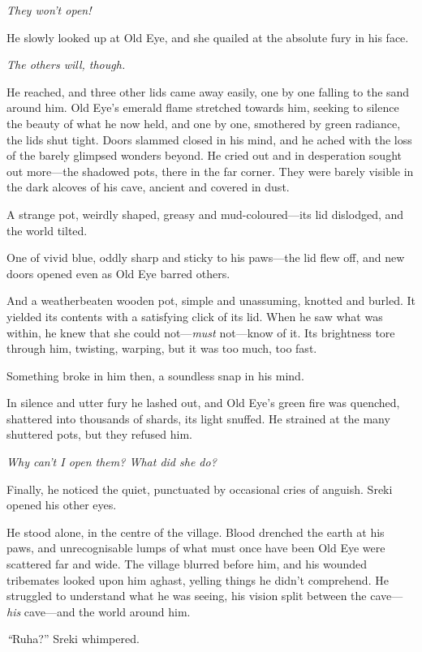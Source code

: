 \emph{They won't open!}

He slowly looked up at Old Eye, and she quailed at the absolute fury in his face.

\emph{The others will, though.}

He reached, and three other lids came away easily, one by one falling to the sand around him. Old Eye's emerald flame stretched towards him, seeking to silence the beauty of what he now held, and one by one, smothered by green radiance, the lids shut tight. Doors slammed closed in his mind, and he ached with the loss of the barely glimpsed wonders beyond. He cried out and in desperation sought out more---the shadowed pots, there in the far corner. They were barely visible in the dark alcoves of his cave, ancient and covered in dust.

A strange pot, weirdly shaped, greasy and mud-coloured---its lid dislodged, and the world tilted.

One of vivid blue, oddly sharp and sticky to his paws---the lid flew off, and new doors opened even as Old Eye barred others.

And a weatherbeaten wooden pot, simple and unassuming, knotted and burled. It yielded its contents with a satisfying click of its lid. When he saw what was within, he knew that she could not---\emph{must} not---know of it. Its brightness tore through him, twisting, warping, but it was too much, too fast.

Something broke in him then, a soundless snap in his mind.

In silence and utter fury he lashed out, and Old Eye's green fire was quenched, shattered into thousands of shards, its light snuffed. He strained at the many shuttered pots, but they refused him.

\emph{Why can't I open them? What did she do?}

Finally, he noticed the quiet, punctuated by occasional cries of anguish. Sreki opened his other eyes.

He stood alone, in the centre of the village. Blood drenched the earth at his paws, and unrecognisable lumps of what must once have been Old Eye were scattered far and wide. The village blurred before him, and his wounded tribemates looked upon him aghast, yelling things he didn't comprehend. He struggled to understand what he was seeing, his vision split between the cave---\emph{his} cave---and the world around him.

\emph{``}Ruha?'' Sreki whimpered.

